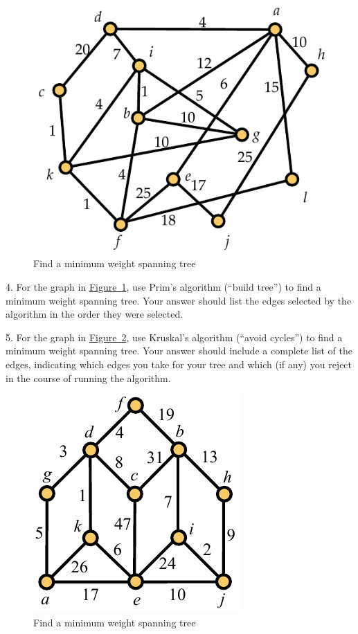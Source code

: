 \documentclass[10pt,]{book}
\theoremstyle{plain}
\theoremstyle{definition}
\theoremstyle{definition}
\theoremstyle{definition}
\theoremstyle{definition}
\numberwithin{equation}{section}
\begin{document}
\begin{exerciselist}
\begin{figure}
\centering
\includegraphics[width=0.65\linewidth]{images/span_tree_ex2}
\caption{Find a minimum weight spanning tree\label{fig_span_tree_ex2}}
\end{figure}
\par\smallskip
\item[4.]\hypertarget{exercise-16}{}\hypertarget{p-258}{}%
For the graph in \hyperref[fig_span_tree_ex2]{Figure~\ref{fig_span_tree_ex2}}, use Prim's algorithm (``build tree'') to find a minimum weight spanning tree. Your answer should list the edges selected by the algorithm in the order they were selected.%
\par\smallskip
\item[5.]\hypertarget{exercise-17}{}\hypertarget{p-259}{}%
For the graph in \hyperref[fig_span_tree_ex3]{Figure~\ref{fig_span_tree_ex3}}, use Kruskal's algorithm (``avoid cycles'') to find a minimum weight spanning tree. Your answer should include a complete list of the edges, indicating which edges you take for your tree and which (if any) you reject in the course of running the algorithm.%
\begin{figure}
\centering
\includegraphics[width=0.45\linewidth]{images/span_tree_ex3}
\caption{Find a minimum weight spanning tree\label{fig_span_tree_ex3}}

\end{figure}
\end{exerciselist}
\end{document}
